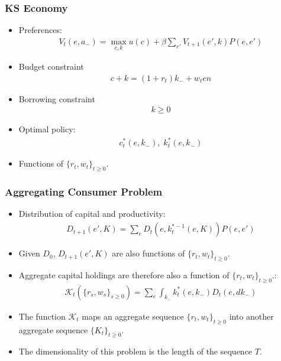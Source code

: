 \documentclass[english,xcolor=svgnames]{beamer}
\begin{document}
\begin{frame}
    \frametitle{KS Economy}
    \begin{itemize}
        \item Preferences:
        \begin{align*}
        	V_t(e,a_{-}) = \max_{c,k} u(c) + \beta \sum_{e'} V_{t+1}(e',k)P(e,e')
        \end{align*}
        \item Budget constraint
        \begin{align*}
        	c+k = (1+r_t)k_{-}+w_t e n
        \end{align*}
        \item Borrowing constraint
        \begin{align*}
        	k \ge 0
        \end{align*}
        \item Optimal policy:
        \begin{align*}
        	c_t^*(e,k_{-}),\; k_t^*(e,k_{-})
        \end{align*}
        \item Functions of $\{r_t,w_t\}_{t\ge 0 }$.
	\end{itemize}
\end{frame}

\begin{frame}
    \frametitle{Aggregating Consumer Problem}
    \begin{itemize}
        \item Distribution of capital and productivity:
        \begin{align*}
        	D_{t+1}(e',K) = \sum_e D_t(e,k_t^{*-1}(e,K))P(e,e')
        \end{align*}
        \item Given $D_0$, $D_{t+1}(e',K)$ are also functions of $\{r_t,w_t\}_{t\ge 0 }$.
        \item Aggregate capital holdings are therefore also a function of $\{r_t,w_t\}_{t\ge 0 }$.:
        \begin{align*}
        	\mathcal{K}_t(\{r_s,w_s\}_{s\ge 0 }) = \sum_e \int_{k_{-}} k_t^*(e,k_{-}) D_t(e,dk_{-})
        \end{align*}
        \item The function $\mathcal{K}_t$ maps an aggregate sequence $\{r_t,w_t\}_{t\ge 0 }$ into another aggregate sequence $\{K_t\}_{t\ge 0}$.
        \item The dimensionality of this problem is the length of the sequence $T$.
	\end{itemize}
\end{frame}
\end{document}
